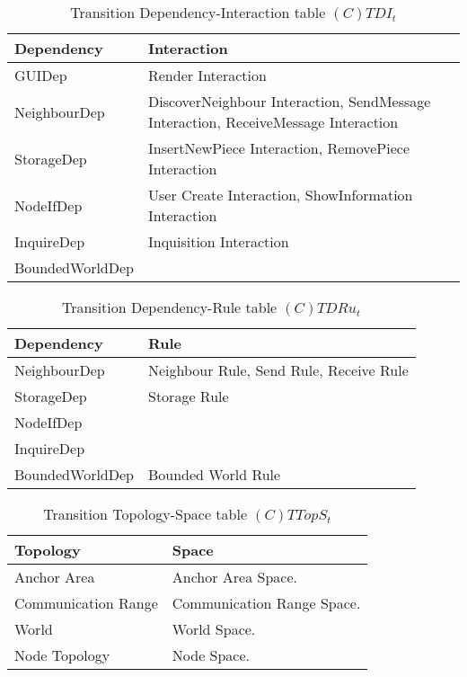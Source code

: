 \begin{table}[H]
	\centering
	\begin{tabular}{|p{4cm}|p{8cm}|}
			\hline
			\textbf{Dependency} & \textbf{Interaction} \\
			\hline
			GUIDep & Render Interaction \\
			\hline
      NeighbourDep & DiscoverNeighbour Interaction, SendMessage Interaction,
      ReceiveMessage Interaction \\
			\hline
			StorageDep & InsertNewPiece Interaction, RemovePiece Interaction \\
			\hline
			NodeIfDep & User Create Interaction, ShowInformation Interaction \\
			\hline
			InquireDep & Inquisition Interaction\\
			\hline
			BoundedWorldDep & \\
			\hline
		\end{tabular}
	\caption{Transition Dependency-Interaction table $(C)TDI_t$}
	\label{tab:ctdit}
\end{table}

\begin{table}[H]
	\centering
	\begin{tabular}{|p{4cm}|p{8cm}|}
			\hline
			\textbf{Dependency} & \textbf{Rule} \\
			\hline
			NeighbourDep & Neighbour Rule, Send Rule, Receive Rule\\
			\hline
			StorageDep & Storage Rule \\
			\hline
			NodeIfDep & \\
			\hline
			InquireDep & \\
			\hline
			BoundedWorldDep & Bounded World Rule\\
			\hline
		\end{tabular}
	\caption{Transition Dependency-Rule table $(C)TDRu_t$}
	\label{tab:ctdrut}
\end{table}

\begin{table}[H]
	\centering
	\begin{tabular}{|p{4cm}|p{8cm}|}
			\hline
			\textbf{Topology} & \textbf{Space} \\
			\hline
			Anchor Area & Anchor Area Space.\\
			\hline
			Communication Range & Communication Range Space. \\
			\hline
			World & World Space. \\
			\hline
			Node Topology & Node Space. \\
			\hline
		\end{tabular}
	\caption{Transition Topology-Space table $(C)TTopS_t$}
	\label{tab:cttopst}
\end{table}

